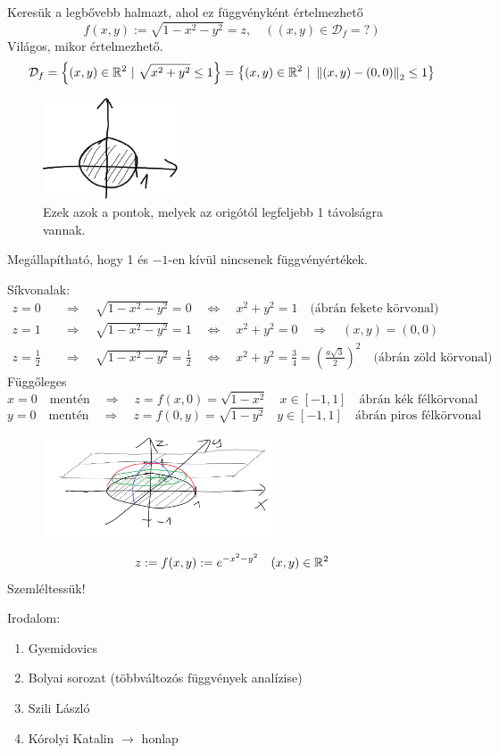\documentclass[a4paper,11.5pt]{article}
\newcommand{\norm}[1]{\left\lVert#1\right\rVert}
\begin{document}
	\begin{task}Keresük a legbővebb halmazt, ahol ez függvényként értelmezhető
		\[ f(x,y):=\sqrt{1-x^2-y^2}=z,\quad ((x,y)\in\mathcal{D}_f=?) \]
		Világos, mikor értelmezhető.
		\[ \mathcal{D}_f=\left\{(x,y)\in\R^2~|~\sqrt{x^2+y^2}\leq 1 \right\}=\left\{ (x,y)\in\R^2~|~\norm{(x,y)-(0,0)}_2\leq 1 \right\} \]
		
		\begin{figure}[H]
			\centering
			\includegraphics[height=3cm]{../2zh/kepek/22.png}
			\caption{Ezek azok a pontok, melyek az origótól legfeljebb 1 távolságra vannak.}
		\end{figure}
		Megállapítható, hogy 1 és $-1$-en kívül nincsenek függvényértékek.
		\smallskip
		
		Síkvonalak:
		\begin{align*}
			z=0&\quad \Rightarrow\quad \sqrt{1-x^2-y^2}=0\quad \Leftrightarrow\quad x^2+y^2=1 \quad \text{(ábrán fekete körvonal)}\\
			z=1&\quad \Rightarrow\quad \sqrt{1-x^2-y^2}=1\quad \Leftrightarrow\quad x^2+y^2=0\quad \Rightarrow\quad (x,y)=(0,0) \\
			z=\frac{1}{2}&\quad \Rightarrow\quad \sqrt{1-x^2-y^2}=\frac{1}{2}\quad \Leftrightarrow\quad x^2+y^2=\frac{3}{4}=\left(\frac{a\sqrt{3}}{2}\right)^2 \quad \text{(ábrán zöld körvonal)}
		\end{align*}
		Függőleges
		\[ x=0\quad \text{mentén}\quad \Rightarrow\quad z=f(x,0)=\sqrt{1-x^2}\quad x\in[-1,1]\quad \text{ábrán kék félkörvonal} \]
		\[ y=0\quad \text{mentén}\quad \Rightarrow\quad  z=f(0,y)=\sqrt{1-y^2}\quad y\in[-1,1]\quad \text{ábrán piros félkörvonal} \]
		\begin{figure}[H]
			\centering
			\includegraphics[height=3cm]{../2zh/kepek/23.png}
			\caption{}
		\end{figure}
	\end{task}
	\begin{exercise}
		\[ z:=f(x,y):=e^{-x^2-y^2}\quad (x,y)\in\mathbb{R}^2 \]
		Szemléltessük!
	\end{exercise}
	\begin{note}
		Irodalom:
		\begin{enumerate}
			\item Gyemidovics
			\item Bolyai sorozat (többváltozós függvények analízise)
			\item Szili László
			\item Kórolyi Katalin $\rightarrow$ honlap
		\end{enumerate}
	\end{note}
\end{document}
